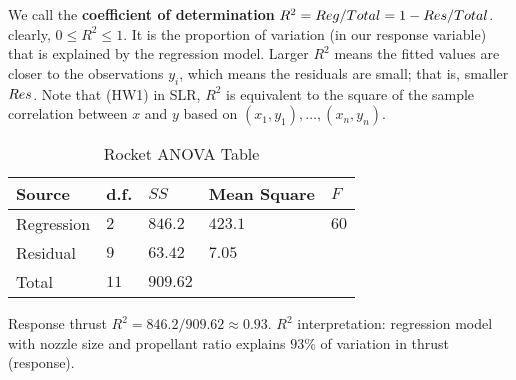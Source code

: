 We call the \textbf{coefficient of determination}
$ R^2 = \relax{Reg}/\relax{Total}=1-\relax{Res}/\relax{Total} $.
clearly, $ 0\leqslant R^2\leqslant 1 $. It is the proportion
of variation (in our response variable) that is explained
by the regression model. Larger $ R^2 $ means
the fitted values are closer to the observations $ y_i $,
which means the residuals are small; that is, smaller $ \relax{Res} $.
Note that (HW1) in SLR, $ R^2 $ is equivalent to the square of
the sample correlation between $ x $ and $ y $
based on $ (x_1,y_1),\ldots,(x_n,y_n) $.

\begin{table}[H]
    \centering
    \caption{Rocket ANOVA Table}
    \begin{tabularx}{\linewidth}{@{}YYYYY@{}}
        \toprule
        Source     & d.f.   & $ SS $     & Mean Square & $ F $  \\
        \midrule
        Regression & $ 2 $  & $ 846.2 $  & $ 423.1 $   & $ 60 $ \\
        Residual   & $ 9 $  & $ 63.42 $  & $ 7.05 $    &        \\
        \midrule
        Total      & $ 11 $ & $ 909.62 $                        \\
        \bottomrule
    \end{tabularx}
\end{table}
Response thrust
$ R^2=846.2/909.62 \approx 0.93 $. $ R^2 $
interpretation: regression model with nozzle size and propellant ratio
explains $ 93\% $ of variation in thrust (response).
